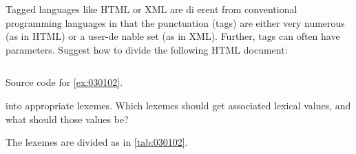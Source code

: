 \begin{exercise}\label{ex:030102}
    Tagged languages like HTML or XML are di erent from conventional programming 
    languages in that the punctuation (tags) are either very numerous (as in HTML) 
    or a user-de nable set (as in XML). Further, tags can often have parameters. 
    Suggest how to divide the following HTML document:
    \begin{listing}[!ht]
        \inputminted[]{html}{03/01/02/ex030102.html}
        \caption{Source code for \cref{ex:030102}.}
        \label{code:030102}
    \end{listing}

    \noindent into appropriate lexemes. Which lexemes should get associated lexical values,
    and what should those values be?
\end{exercise}
\begin{solution}\label{sol:030102}
    The lexemes are divided as in \autoref{tab:030102}.
    
\end{solution}